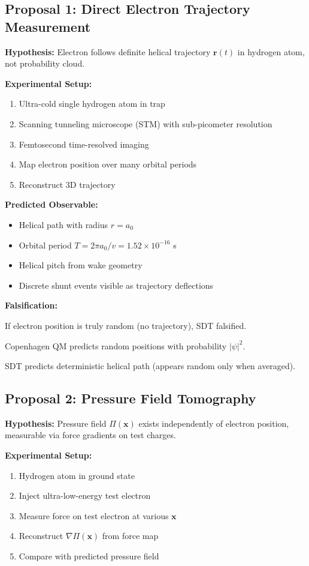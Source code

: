 \subsection{Proposal 1: Direct Electron Trajectory Measurement}

\textbf{Hypothesis:} Electron follows definite helical trajectory $\mathbf{r}(t)$ in hydrogen atom, not probability cloud.

\textbf{Experimental Setup:}

\begin{enumerate}
\item Ultra-cold single hydrogen atom in trap
\item Scanning tunneling microscope (STM) with sub-picometer resolution
\item Femtosecond time-resolved imaging
\item Map electron position over many orbital periods
\item Reconstruct 3D trajectory
\end{enumerate}

\textbf{Predicted Observable:}

\begin{itemize}
\item Helical path with radius $r = a_0$
\item Orbital period $T = 2\pi a_0/v = 1.52 \times 10^{-16}$ s
\item Helical pitch from wake geometry
\item Discrete shunt events visible as trajectory deflections
\end{itemize}

\textbf{Falsification:}

If electron position is truly random (no trajectory), SDT falsified.

Copenhagen QM predicts random positions with probability $|\psi|^2$.

SDT predicts deterministic helical path (appears random only when averaged).

\subsection{Proposal 2: Pressure Field Tomography}

\textbf{Hypothesis:} Pressure field $\Pi(\mathbf{x})$ exists independently of electron position, measurable via force gradients on test charges.

\textbf{Experimental Setup:}

\begin{enumerate}
\item Hydrogen atom in ground state
\item Inject ultra-low-energy test electron
\item Measure force on test electron at various $\mathbf{x}$
\item Reconstruct $\nabla \Pi(\mathbf{x})$ from force map
\item Compare with predicted pressure field
\end{enumerate}

